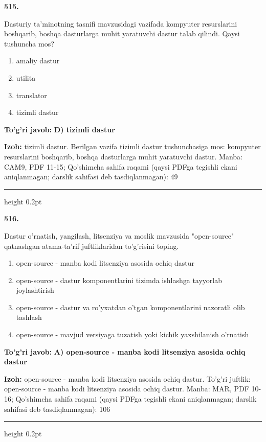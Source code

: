 \documentclass[10pt,a4paper]{article}
\begin{document}
{\bfseries\sffamily\color{ink} 515.}
\par
Dasturiy ta'minotning tasnifi mavzusidagi vazifada kompyuter resurslarini boshqarib, boshqa dasturlarga muhit yaratuvchi dastur talab qilindi. Qaysi tushuncha mos?
\begin{enumerate}[label=\Alph*),leftmargin=9mm]
\item amaliy dastur
\item utilita
\item translator
\item tizimli dastur
\end{enumerate}
\begin{tcolorbox}[enhanced,breakable,colback=teal!4,colframe=teal!60!black,boxrule=0.45pt,arc=1.2mm,left=2.7mm,right=2.7mm,top=1.8mm,bottom=1.8mm,before skip=2mm,after skip=2mm]
{\bfseries\sffamily\color{teal}To'g'ri javob:} \textbf{D) tizimli dastur}
\par\smallskip
{\bfseries Izoh:} tizimli dastur. Berilgan vazifa tizimli dastur tushunchasiga mos: kompyuter resurslarini boshqarib, boshqa dasturlarga muhit yaratuvchi dastur. Manba: CAM9, PDF 11-15; Qo'shimcha sahifa raqami (qaysi PDFga tegishli ekani aniqlanmagan; darslik sahifasi deb tasdiqlanmagan): 49
\end{tcolorbox}
\vspace{2mm}\hrule height 0.2pt\vspace{3mm}

{\bfseries\sffamily\color{ink} 516.}
\par
Dastur o'rnatish, yangilash, litsenziya va moslik mavzusida "open-source" qatnashgan atama-ta'rif juftliklaridan to'g'risini toping.
\begin{enumerate}[label=\Alph*),leftmargin=9mm]
\item open-source - manba kodi litsenziya asosida ochiq dastur
\item open-source - dastur komponentlarini tizimda ishlashga tayyorlab joylashtirish
\item open-source - dastur va ro'yxatdan o'tgan komponentlarini nazoratli olib tashlash
\item open-source - mavjud versiyaga tuzatish yoki kichik yaxshilanish o'rnatish
\end{enumerate}
\begin{tcolorbox}[enhanced,breakable,colback=teal!4,colframe=teal!60!black,boxrule=0.45pt,arc=1.2mm,left=2.7mm,right=2.7mm,top=1.8mm,bottom=1.8mm,before skip=2mm,after skip=2mm]
{\bfseries\sffamily\color{teal}To'g'ri javob:} \textbf{A) open-source - manba kodi litsenziya asosida ochiq dastur}
\par\smallskip
{\bfseries Izoh:} open-source - manba kodi litsenziya asosida ochiq dastur. To'g'ri juftlik: open-source - manba kodi litsenziya asosida ochiq dastur. Manba: MAR, PDF 10-16; Qo'shimcha sahifa raqami (qaysi PDFga tegishli ekani aniqlanmagan; darslik sahifasi deb tasdiqlanmagan): 106
\end{tcolorbox}
\vspace{2mm}\hrule height 0.2pt\vspace{3mm}
\end{document}
